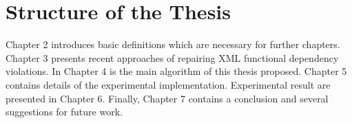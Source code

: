 \section{Structure of the Thesis}

Chapter 2 introduces basic definitions which are necessary for further chapters. Chapter 3 presents recent approaches of repairing XML functional dependency violations. In Chapter 4 is the main algorithm of this thesis proposed. Chapter 5 contains details of the experimental implementation. Experimental result are presented in Chapter 6. Finally, Chapter 7 contains a conclusion and several suggestions for future work.
